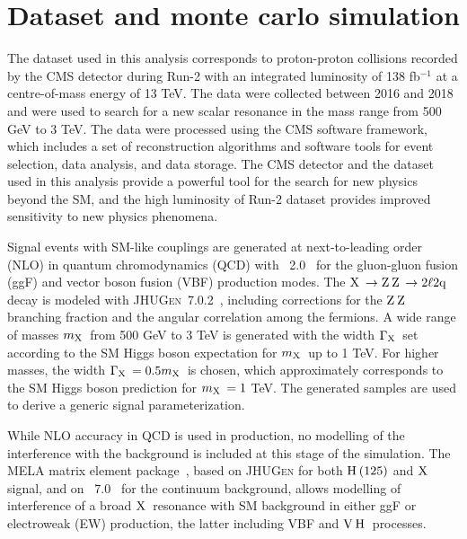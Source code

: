 \section{Dataset and monte carlo simulation}
\label{sec:MC}

The dataset used in this analysis corresponds to proton-proton collisions recorded by the CMS detector during Run-2 with an integrated luminosity of 138 fb$^{-1}$ at a centre-of-mass energy of 13 TeV.
The data were collected between 2016 and 2018 and were used to search for a new scalar resonance in the mass range from 500 GeV to 3 TeV.
The data were processed using the CMS software framework, which includes a set of reconstruction algorithms and software tools for event selection, data analysis, and data storage.
The CMS detector and the dataset used in this analysis provide a powerful tool for the search for new physics beyond the SM, and the high luminosity of Run-2 dataset provides improved sensitivity to new physics phenomena.

Signal events with SM-like couplings are generated at next-to-leading order (NLO) in quantum chromodynamics (QCD) with \POWHEG\ 2.0~\cite{Frixione:2007vw,Bagnaschi:2011tu,Nason:2009ai,Nason:2004rx,Alioli:2010xd} for the gluon-gluon fusion (ggF) and vector boson fusion (VBF) production modes. The $\mathrm{X}\hspace{0.2em} \to \mathrm{Z}\hspace{0.2em}\mathrm{Z}\hspace{0.2em} \to 2\ell2\mathrm{q}\hspace{0.2em}$ decay is modeled with \textsc{JHUGen}\ 7.0.2~\cite{Gao:2010qx,Bolognesi:2012mm,Anderson:2013afp,Gritsan:2016hjl}, including corrections for the $\mathrm{Z}\hspace{0.2em}\mathrm{Z}\hspace{0.2em}$ branching fraction and the angular correlation among the fermions. A wide range of masses $m_{\mathrm{X}\hspace{0.2em}}$ from 500 GeV to 3 TeV is generated with the width $\Gamma_{\mathrm{X}\hspace{0.2em}}$ set according to the SM Higgs boson expectation for $m_{\mathrm{X}\hspace{0.2em}}$ up to 1 TeV. For higher masses, the width $\Gamma_{\mathrm{X}\hspace{0.2em}} = 0.5m_{\mathrm{X}\hspace{0.2em}}$ is chosen, which approximately corresponds to the SM Higgs boson prediction for $m_{\mathrm{X}\hspace{0.2em}} = 1$ TeV. The generated samples are used to derive a generic signal parameterization.

While NLO accuracy in QCD is used in production, no modelling of the interference with the background is included at this stage of the simulation. The MELA matrix element package~\cite{Gao:2010qx,Bolognesi:2012mm,Anderson:2013afp,Gritsan:2016hjl}, based on \textsc{JHUGen} for both $\mathrm{H}\hspace{0.2em}(125)$ and $\mathrm{X}\hspace{0.2em}$ signal, and on \MCFM\ 7.0~\cite{MCFM,Campbell:2011bn,Campbell:2013una} for the continuum background, allows modelling of interference of a broad $\mathrm{X}\hspace{0.2em}$ resonance with SM background in either ggF or electroweak (EW) production, the latter including VBF and $\mathrm{V}\hspace{0.2em}\mathrm{H}\hspace{0.2em}$ processes.

